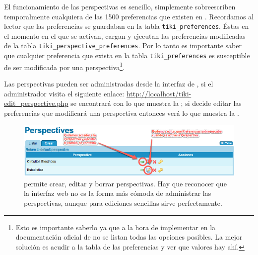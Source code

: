 El funcionamiento de las perspectivas es sencillo, simplemente sobreescriben temporalmente cualquiera de las 1500 preferencias que existen en \tiki{}. Recordamos al lector que las preferencias se guardaban en la tabla \texttt{tiki\_preferences}. Éstas en el momento en el que se activan, cargan y ejecutan las preferencias modificadas de la tabla \texttt{tiki\_perspective\_preferences}. Por lo tanto es importante saber que cualquier preferencia que exista en la tabla \texttt{tiki\_preferences} es susceptible de ser modificada por una perspectiva\footnote{Esto es importante saberlo ya que a la hora de implementar \profiles{} en la documentación oficial de \tiki{} no se listan todas las opciones posibles. La mejor solución es acudir a la tabla de las preferencias y ver que valores hay ahí.}. 

Las perspectivas pueden ser administradas desde la interfaz de \tiki{}, si el administrador visita el siguiente enlace: \url{http://localhost/tiki-edit_perspective.php} se encontrará con lo que muestra la ; si decide editar las preferencias que modificará una perspectiva entonces verá lo que muestra la .

\begin{figure}
\centering
\includegraphics[width=\linewidth]{../graphics/fig_panel_administracion_perspectivas.png}
\caption{\tiki{} permite crear, editar y borrar perspectivas. Hay que reconocer que la interfaz web no es la forma más cómoda de administrar las perspectivas, aunque para ediciones sencillas sirve perfectamente.}\label{fig:panel_administracion_perspectivas}
\end{figure}

